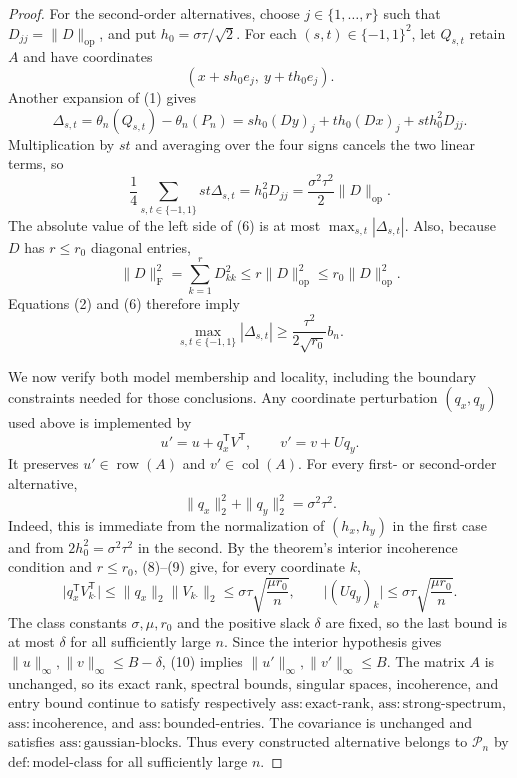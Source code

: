 \documentclass{article}
\begin{document}
\begin{proof}
For the second-order alternatives, choose \(j\in\{1,\ldots,r\}\) such that \(D_{jj}=\|D\|_{\mathrm{op}}\), and put \(h_0=\sigma\tau/\sqrt2\).  For each \((s,t)\in\{-1,1\}^2\), let \(Q_{s,t}\) retain \(A\) and have coordinates
\[
(x+s h_0e_j,\ y+t h_0e_j).
\]
Another expansion of (1) gives
\[
\Delta_{s,t}
=\theta_n(Q_{s,t})-\theta_n(P_n)
=s h_0(Dy)_j+t h_0(Dx)_j+st h_0^2D_{jj}. \tag{5}
\]
Multiplication by \(st\) and averaging over the four signs cancels the two linear terms, so
\[
\frac14\sum_{s,t\in\{-1,1\}}st\Delta_{s,t}
=h_0^2D_{jj}
=\frac{\sigma^2\tau^2}{2}\|D\|_{\mathrm{op}}. \tag{6}
\]
The absolute value of the left side of (6) is at most \(\max_{s,t}|\Delta_{s,t}|\).  Also, because \(D\) has \(r\leq r_0\) diagonal entries,
\[
\|D\|_{\mathrm F}^2=\sum_{k=1}^rD_{kk}^2
\leq r\|D\|_{\mathrm{op}}^2
\leq r_0\|D\|_{\mathrm{op}}^2.
\]
Equations (2) and (6) therefore imply
\[
\max_{s,t\in\{-1,1\}}|\Delta_{s,t}|
\geq\frac{\tau^2}{2\sqrt{r_0}}b_n. \tag{7}
\]

We now verify both model membership and locality, including the boundary constraints needed for those conclusions.  Any coordinate perturbation \((q_x,q_y)\) used above is implemented by
\[
u'=u+q_x^{\mathsf T}V^{\mathsf T},
\qquad
v'=v+Uq_y. \tag{8}
\]
It preserves \(u'\in\operatorname{row}(A)\) and \(v'\in\operatorname{col}(A)\).  For every first- or second-order alternative,
\[
\|q_x\|_2^2+\|q_y\|_2^2=\sigma^2\tau^2. \tag{9}
\]
Indeed, this is immediate from the normalization of \((h_x,h_y)\) in the first case and from \(2h_0^2=\sigma^2\tau^2\) in the second.  By the theorem's interior incoherence condition and \(r\leq r_0\), (8)--(9) give, for every coordinate \(k\),
\[
\bigl|q_x^{\mathsf T}V_{k\mathbin{\boldsymbol\cdot}}^{\mathsf T}\bigr|
\leq\|q_x\|_2\|V_{k\mathbin{\boldsymbol\cdot}}\|_2
\leq\sigma\tau\sqrt{\frac{\mu r_0}{n}},
\qquad
\bigl|(Uq_y)_k\bigr|
\leq\sigma\tau\sqrt{\frac{\mu r_0}{n}}. \tag{10}
\]
The class constants \(\sigma,\mu,r_0\) and the positive slack \(\delta\) are fixed, so the last bound is at most \(\delta\) for all sufficiently large \(n\).  Since the interior hypothesis gives \(\|u\|_\infty,\|v\|_\infty\leq B-\delta\), (10) implies \(\|u'\|_\infty,\|v'\|_\infty\leq B\).  The matrix \(A\) is unchanged, so its exact rank, spectral bounds, singular spaces, incoherence, and entry bound continue to satisfy respectively \(\mathrm{ass{:}exact\mbox{-}rank}\), \(\mathrm{ass{:}strong\mbox{-}spectrum}\), \(\mathrm{ass{:}incoherence}\), and \(\mathrm{ass{:}bounded\mbox{-}entries}\).  The covariance is unchanged and satisfies \(\mathrm{ass{:}gaussian\mbox{-}blocks}\).  Thus every constructed alternative belongs to \(\mathcal P_n\) by \(\mathrm{def{:}model\mbox{-}class}\) for all sufficiently large \(n\).


\end{proof}
\end{document}
